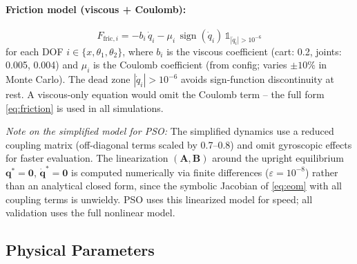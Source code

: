 \documentclass[11pt, a4paper]{article}
\newcommand{\vq}{\boldsymbol{q}}
\newcommand{\sign}{\operatorname{sign}}
\begin{document}
\paragraph{Friction model (viscous + Coulomb):}
\begin{equation}
  F_{\text{fric},i} = -b_i\,\dot{q}_i
    - \mu_i\,\sign(\dot{q}_i)\,\mathbb{1}_{|\dot{q}_i|>10^{-6}}
  \label{eq:friction}
\end{equation}
for each DOF $i \in \{x, \theta_1, \theta_2\}$, where $b_i$ is the viscous
coefficient (cart: 0.2, joints: 0.005, 0.004) and $\mu_i$ is the Coulomb
coefficient (from config; varies $\pm10\%$ in Monte Carlo).
The dead zone $|\dot{q}_i| > 10^{-6}$ avoids sign-function discontinuity
at rest. A viscous-only equation would omit the Coulomb term --
the full form \eqref{eq:friction} is used in all simulations.

\textit{Note on the simplified model for PSO:} The simplified dynamics use
a reduced coupling matrix (off-diagonal terms scaled by 0.7--0.8) and
omit gyroscopic effects for faster evaluation. The linearization
$(\mathbf{A}, \mathbf{B})$ around the upright equilibrium
$\vq^* = \mathbf{0}$, $\dot{\vq}^* = \mathbf{0}$ is computed numerically
via finite differences ($\varepsilon = 10^{-8}$) rather than an
analytical closed form, since the symbolic Jacobian of \eqref{eq:eom}
with all coupling terms is unwieldy. PSO uses this linearized model
for speed; all validation uses the full nonlinear model.

\subsection{Physical Parameters}
\end{document}
